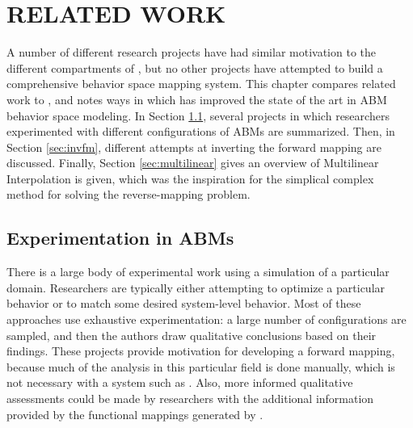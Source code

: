\chapter{RELATED WORK}
\thispagestyle{plain}

\label{RelatedWork}

A number of different research projects have had similar motivation to the different compartments of \fw, but no other projects have attempted to build a comprehensive behavior space mapping system.
This chapter compares related work to \fw, and notes ways in which \fw has improved the state of the art in ABM behavior space modeling.
In Section \ref{sec:abmexp}, several projects in which researchers experimented with different configurations of ABMs are summarized.
Then, in Section \ref{sec:invfm}, different attempts at inverting the forward mapping are discussed.
Finally, Section \ref{sec:multilinear} gives an overview of Multilinear Interpolation is given, which was the inspiration for the simplical complex method for solving the reverse-mapping problem.

\section{Experimentation in ABMs}
\label{sec:abmexp}

There is a large body of experimental work using a simulation of a particular domain.
Researchers are typically either attempting to optimize a particular behavior or to match some desired system-level behavior.
Most of these approaches use exhaustive experimentation: a large number of configurations are sampled, and then the authors draw qualitative conclusions based on their findings.
These projects provide motivation for developing a forward mapping, because much of the analysis in this particular field is done manually, which is not necessary with a system such as \fw.
Also, more informed qualitative assessments could be made by researchers with the additional information provided by the functional mappings generated by \fw.

